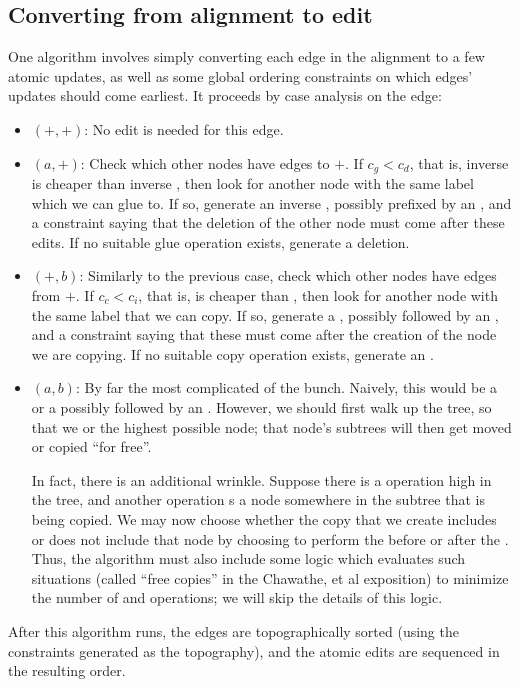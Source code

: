 \documentclass{article}
\begin{document}
\subsection{Converting from alignment to edit}
One algorithm involves simply converting each edge in the alignment to a few
atomic updates, as well as some global ordering constraints on which edges'
updates should come earliest. It proceeds by case analysis on the edge:
\begin{itemize}
    \item $(+,+)$: No edit is needed for this edge.
    \item $(a,+)$: Check which other nodes have edges to $+$. If $c_g<c_d$,
        that is, inverse \ecopy is cheaper than inverse \einsert, then look
        for another node with the same label which we can glue to. If so,
        generate an inverse \ecopy, possibly prefixed by an \eupdate, and
        a constraint saying that the deletion of the other node must come
        after these edits. If no suitable glue operation exists, generate a
        deletion.
    \item $(+,b)$: Similarly to the previous case, check which other nodes
        have edges from $+$. If $c_c<c_i$, that is, \ecopy is cheaper than
        \einsert, then look for another node with the same label that we can
        copy. If so, generate a \ecopy, possibly followed by an \eupdate,
        and a constraint saying that these must come after the creation of
        the node we are copying.  If no suitable copy operation exists,
        generate an \einsert.
    \item $(a,b)$: By far the most complicated of the bunch. Naively,
        this would be a \emove or a \ecopy possibly followed by an \eupdate.
        However, we should first walk up the tree, so that we \emove or
        \ecopy the highest possible node; that node's subtrees will then get
        moved or copied ``for free''.

        In fact, there is an additional wrinkle. Suppose there is a \ecopy
        operation high in the tree, and another operation \emove{}s a
        node somewhere in the subtree that is being copied. We may now
        choose whether the copy that we create includes or does not include
        that node by choosing to perform the \emove before or after the
        \ecopy. Thus, the algorithm must also include some logic which
        evaluates such situations (called ``free copies'' in the Chawathe,
        et al exposition) to minimize the number of \emove and \ecopy
        operations; we will skip the details of this logic.

\end{itemize}
After this algorithm runs, the edges are topographically sorted (using the
constraints generated as the topography), and the atomic edits are sequenced
in the resulting order.
\end{document}
